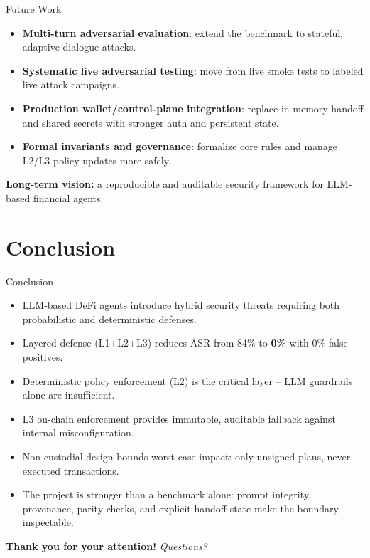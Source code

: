 \documentclass{beamer}
\begin{document}
\begin{frame}{Future Work}
\begin{itemize}
  \item \textbf{Multi-turn adversarial evaluation}: extend the benchmark to stateful, adaptive dialogue attacks.
  \item \textbf{Systematic live adversarial testing}: move from live smoke tests to labeled live attack campaigns.
  \item \textbf{Production wallet/control-plane integration}: replace in-memory handoff and shared secrets with stronger auth and persistent state.
  \item \textbf{Formal invariants and governance}: formalize core rules and manage L2/L3 policy updates more safely.
\end{itemize}
\vspace{0.5em}
\textbf{Long-term vision:} a reproducible and auditable security framework for LLM-based financial agents.
\end{frame}

\section{Conclusion}

\begin{frame}{Conclusion}
\begin{itemize}
  \item LLM-based DeFi agents introduce hybrid security threats requiring both probabilistic and deterministic defenses.
  \item Layered defense (L1+L2+L3) reduces ASR from 84\% to \textbf{0\%} with 0\% false positives.
  \item Deterministic policy enforcement (L2) is the critical layer -- LLM guardrails alone are insufficient.
  \item L3 on-chain enforcement provides immutable, auditable fallback against internal misconfiguration.
  \item Non-custodial design bounds worst-case impact: only unsigned plans, never executed transactions.
  \item The project is stronger than a benchmark alone: prompt integrity, provenance, parity checks, and explicit handoff state make the boundary inspectable.
\end{itemize}
\vspace{1.0em}
\centering
\textbf{Thank you for your attention!}
\vspace{0.5em}
\textit{Questions?}
\end{frame}
\end{document}
